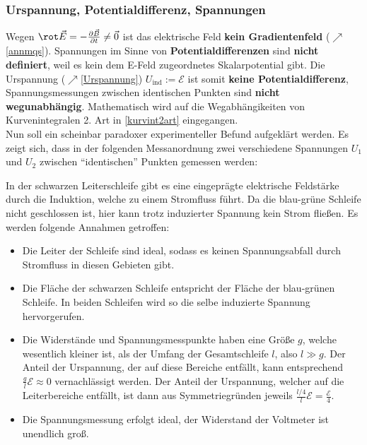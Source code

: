   \subsubsection{Urspannung, Potentialdifferenz, Spannungen}
		   Wegen $\rot \vec{E} = -\frac{\partial \vec{B} }{\partial t} \ne \vec{0}$ ist das elektrische Feld \textbf{kein Gradientenfeld} ($\nearrow$\ref{annmqs}). Spannungen im Sinne von \textbf{Potentialdifferenzen} sind \textbf{nicht definiert}, weil es kein dem E-Feld zugeordnetes Skalarpotential gibt. Die Urspannung ($\nearrow$\ref{Urspannung}) $U_\text{ind}:=\mathcal{E}$ ist somit \textbf{keine Potentialdifferenz}, Spannungsmessungen zwischen identischen Punkten sind \textbf{nicht wegunabhängig}. Mathematisch wird auf die Wegabhängikeiten von Kurvenintegralen 2. Art in \ref{kurvint2art} eingegangen.\\ Nun soll ein scheinbar paradoxer experimenteller Befund aufgeklärt werden. Es zeigt sich, dass in der folgenden Messanordnung zwei verschiedene Spannungen $U_1$ und $U_2$ zwischen \enquote{identischen} Punkten gemessen werden:
		        \begin{center}
			        \resizebox{\textwidth}{!}{}
		        \end{center}
		        In der schwarzen Leiterschleife gibt es eine eingeprägte elektrische Feldstärke durch die Induktion, welche zu einem Stromfluss führt. Da die blau-grüne Schleife nicht geschlossen ist, hier kann trotz induzierter Spannung kein Strom fließen. Es werden folgende Annahmen getroffen:
		        \begin{itemize}
		        	\item Die Leiter der Schleife sind ideal, sodass es keinen Spannungsabfall durch Stromfluss in diesen Gebieten gibt.
		        	\item Die Fläche der schwarzen Schleife entspricht der Fläche der blau-grünen Schleife. In beiden Schleifen wird so die selbe induzierte Spannung hervorgerufen.
		        	\item Die Widerstände und Spannungsmesspunkte haben eine Größe $g$, welche wesentlich kleiner ist, als der Umfang der Gesamtschleife $l$, also $l\gg g$. Der Anteil der Urspannung, der auf diese Bereiche entfällt, kann entsprechend $\frac{g}{l}\mathcal{E}\approx 0$ vernachlässigt werden. Der Anteil der Urspannung, welcher auf die Leiterbereiche entfällt, ist dann aus Symmetriegründen jeweils $\frac{l/4}{l}\mathcal{E}=\frac{\mathcal{E}}{4}$.
		        	\item Die Spannungsmessung erfolgt ideal, der Widerstand der Voltmeter ist unendlich groß.
		        \end{itemize} 
